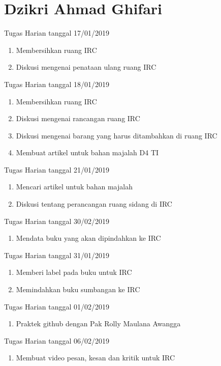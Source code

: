 \chapter{Dzikri Ahmad Ghifari}

Tugas Harian tanggal 17/01/2019
\begin{enumerate}
\item Membersihkan ruang IRC
\item Diskusi mengenai penataan ulang ruang IRC
\end{enumerate}

Tugas Harian tanggal 18/01/2019
\begin{enumerate}
\item Membersihkan ruang IRC
\item Diskusi mengenai rancangan ruang IRC
\item Diskusi mengenai barang yang harus ditambahkan di ruang IRC
\item Membuat artikel untuk bahan majalah D4 TI
\end{enumerate}

Tugas Harian tanggal 21/01/2019
\begin{enumerate}
\item Mencari artikel untuk bahan majalah
\item Diskusi tentang perancangan ruang sidang di IRC
\end{enumerate}

Tugas Harian tanggal 30/02/2019
\begin{enumerate}
\item Mendata buku yang akan dipindahkan ke IRC
\end{enumerate}

Tugas Harian tanggal 31/01/2019
\begin{enumerate}
\item Memberi label pada buku untuk IRC
\item Memindahkan buku sumbangan ke IRC
\end{enumerate}

Tugas Harian tanggal 01/02/2019
\begin{enumerate}
\item Praktek github dengan Pak Rolly Maulana Awangga 
\end{enumerate}

Tugas Harian tanggal 06/02/2019
\begin{enumerate}
\item Membuat video pesan, kesan dan kritik untuk IRC
\end{enumerate}

